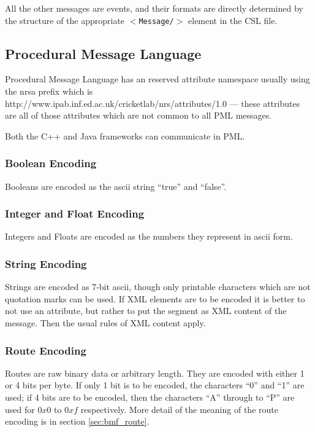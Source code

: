 \documentclass[pdftex,a4paper]{article}
\newcommand{\XML}[2][]{{\tt \small $<$#2#1/$>$}}
\begin{document}
All the other messages are events, and their formats are directly
determined by the structure of the appropriate \XML{Message} element
in the CSL file.

\subsection{Procedural Message Language}

Procedural Message Language has an reserved attribute namespace
usually using the nrsa prefix which is
http://www.ipab.inf.ed.ac.uk/cricketlab/nrs/attributes/1.0 --- these
attributes are all of those attributes which are not common to all PML
messages.

Both the C++ and Java frameworks can communicate in PML.

\subsubsection{Boolean Encoding}

Booleans are encoded as the ascii string ``true'' and ``false''.

\subsubsection{Integer and Float Encoding}

Integers and Floats are encoded as the numbers they represent in ascii
form.

\subsubsection{String Encoding}

Strings are encoded as 7-bit ascii, though only printable characters
which are not quotation marks can be used. If XML elements are to be
encoded it is better to not use an attribute, but rather to put the
segment as XML content of the message. Then the usual rules of XML
content apply.

\subsubsection{Route Encoding}

Routes are raw binary data or arbitrary length. They are encoded with
either 1 or 4 bits per byte. If only 1 bit is to be encoded, the
characters ``0'' and ``1'' are used; if 4 bits are to be encoded, then
the characters ``A'' through to ``P'' are used for $0x0$ to $0xf$
respectively. More detail of the meaning of the route encoding is in
section \ref{sec:bmf_route}.
\end{document}
